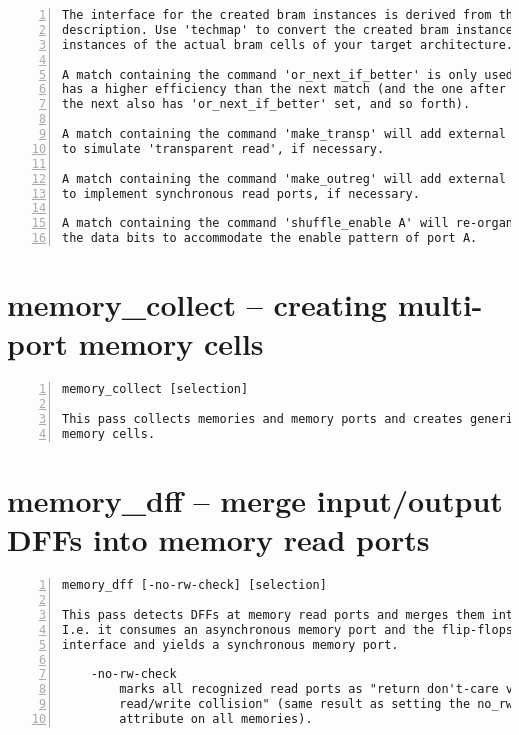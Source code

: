 \begin{lstlisting}[numbers=left,frame=single]
The interface for the created bram instances is derived from the bram
description. Use 'techmap' to convert the created bram instances into
instances of the actual bram cells of your target architecture.

A match containing the command 'or_next_if_better' is only used if it
has a higher efficiency than the next match (and the one after that if
the next also has 'or_next_if_better' set, and so forth).

A match containing the command 'make_transp' will add external circuitry
to simulate 'transparent read', if necessary.

A match containing the command 'make_outreg' will add external flip-flops
to implement synchronous read ports, if necessary.

A match containing the command 'shuffle_enable A' will re-organize
the data bits to accommodate the enable pattern of port A.
\end{lstlisting}

\section{memory\_collect -- creating multi-port memory cells}
\label{cmd:memory_collect}
\begin{lstlisting}[numbers=left,frame=single]
    memory_collect [selection]

This pass collects memories and memory ports and creates generic multiport
memory cells.
\end{lstlisting}

\section{memory\_dff -- merge input/output DFFs into memory read ports}
\label{cmd:memory_dff}
\begin{lstlisting}[numbers=left,frame=single]
    memory_dff [-no-rw-check] [selection]

This pass detects DFFs at memory read ports and merges them into the memory port.
I.e. it consumes an asynchronous memory port and the flip-flops at its
interface and yields a synchronous memory port.

    -no-rw-check
        marks all recognized read ports as "return don't-care value on
        read/write collision" (same result as setting the no_rw_check
        attribute on all memories).
\end{lstlisting}


